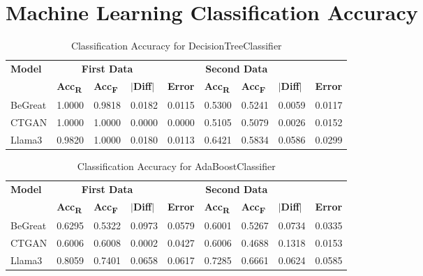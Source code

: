 \chapter*{Machine Learning Classification Accuracy}
\label{app:ml_appendix}


\begin{table}[H]
    \centering
    \caption{Classification Accuracy for DecisionTreeClassifier}
    \label{tab:decision_tree_accuracy_combined}
    \begin{tabularx}{\textwidth}{l*{8}{X}}
        \toprule
        \textbf{Model} & \multicolumn{3}{c}{\textbf{First Data}} & \multicolumn{4}{c}{\textbf{Second Data}} \\
        \cmidrule(lr){2-4} \cmidrule(lr){5-8}
        & \textbf{Acc\textsubscript{R}} & \textbf{Acc\textsubscript{F}} & \textbf{$|$Diff$|$} & \textbf{Error} & \textbf{Acc\textsubscript{R}} & \textbf{Acc\textsubscript{F}} & \textbf{$|$Diff$|$} & \textbf{Error} \\
        \midrule
        BeGreat & 1.0000 & 0.9818 & 0.0182 & 0.0115 & 0.5300 & 0.5241 & 0.0059 & 0.0117 \\
        CTGAN & 1.0000 & 1.0000 & 0.0000 & 0.0000 & 0.5105 & 0.5079 & 0.0026 & 0.0152 \\
        Llama3 & 0.9820 & 1.0000 & 0.0180 & 0.0113 & 0.6421 & 0.5834 & 0.0586 & 0.0299 \\
        \bottomrule
    \end{tabularx}
\end{table}

\begin{table}[H]
    \centering
    \caption{Classification Accuracy for AdaBoostClassifier}
    \label{tab:adaboost_accuracy_combined}
    \begin{tabularx}{\textwidth}{l*{8}{X}}
        \toprule
        \textbf{Model} & \multicolumn{3}{c}{\textbf{First Data}} & \multicolumn{4}{c}{\textbf{Second Data}} \\
        \cmidrule(lr){2-4} \cmidrule(lr){5-8}
        & \textbf{Acc\textsubscript{R}} & \textbf{Acc\textsubscript{F}} & \textbf{$|$Diff$|$} & \textbf{Error} & \textbf{Acc\textsubscript{R}} & \textbf{Acc\textsubscript{F}} & \textbf{$|$Diff$|$} & \textbf{Error} \\
        \midrule
        BeGreat & 0.6295 & 0.5322 & 0.0973 & 0.0579 & 0.6001 & 0.5267 & 0.0734 & 0.0335 \\
        CTGAN & 0.6006 & 0.6008 & 0.0002 & 0.0427 & 0.6006 & 0.4688 & 0.1318 & 0.0153 \\
        Llama3 & 0.8059 & 0.7401 & 0.0658 & 0.0617 & 0.7285 & 0.6661 & 0.0624 & 0.0585 \\
        \bottomrule
    \end{tabularx}
\end{table}


